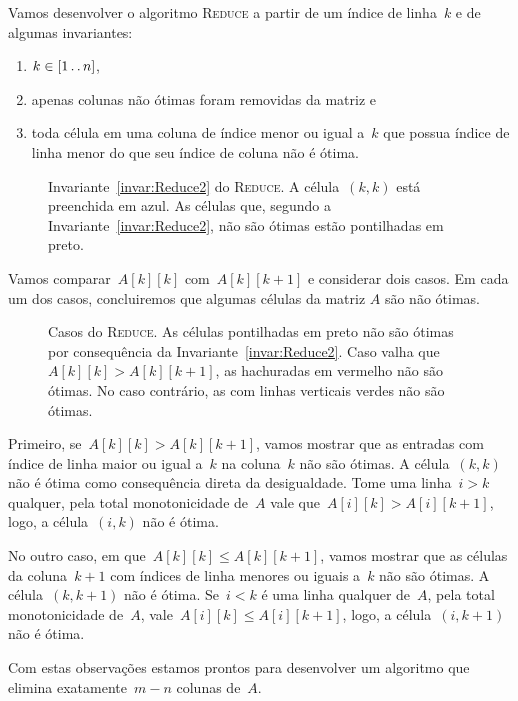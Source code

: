 Vamos desenvolver o algoritmo \textsc{Reduce} a partir de um índice de linha~$k$ e de algumas invariantes: 
\begin{enumerate}
    \item $k \in [1 \,.\,.\, n]$, \label{invar:Reduce0}
    \item apenas colunas não ótimas foram removidas da matriz e \label{invar:Reduce1}
    \item toda célula em uma coluna de índice menor ou igual a~$k$ que possua índice de linha menor do que seu índice de coluna não é ótima. \label{invar:Reduce2}
\end{enumerate}

\begin{figure}[h]
    \centering
    
    \caption{Invariante~\ref{invar:Reduce2} do \textsc{Reduce}. A célula~$(k,k)$ está preenchida em azul. As células que, segundo a Invariante~\ref{invar:Reduce2}, não são ótimas estão pontilhadas em preto.} \label{figure:Reduce1}
\end{figure}

Vamos comparar~$A[k][k]$ com~$A[k][k+1]$ e considerar dois casos. Em cada um dos casos, concluiremos que algumas células da matriz $A$ são não ótimas.

\begin{figure}[h]
    \centering
    
    \caption{Casos do \textsc{Reduce}. As células pontilhadas em preto não são ótimas por consequência da Invariante~\ref{invar:Reduce2}. Caso valha que~$A[k][k] > A[k][k+1]$, as hachuradas em vermelho não são ótimas. No caso contrário, as com linhas verticais verdes não são ótimas.} \label{figure:Reduce2}
\end{figure}

Primeiro, se~$A[k][k] > A[k][k+1]$, vamos mostrar que as entradas com índice de linha maior ou igual a~$k$ na coluna~$k$ não são ótimas. A célula~$(k,k)$ não é ótima como consequência direta da desigualdade. Tome uma linha~${ i > k }$ qualquer, pela total monotonicidade de~$A$ vale que~${ A[i][k] > A[i][k+1] }$, logo, a célula~$(i,k)$ não é ótima.

No outro caso, em que~$A[k][k] \leq A[k][k+1]$, vamos mostrar que as células da coluna~$k+1$ com índices de linha menores ou iguais a~$k$ não são ótimas. A célula~$(k,k+1)$ não é ótima. Se~${ i < k }$ é uma linha qualquer de~$A$, pela total monotonicidade de~$A$, vale~${ A[i][k] \leq A[i][k+1] }$, logo, a célula~$(i,k+1)$ não é ótima.

Com estas observações estamos prontos para desenvolver um algoritmo que elimina exatamente~${ m-n }$ colunas de~$A$. 

